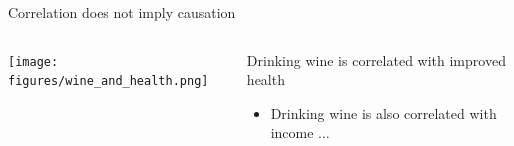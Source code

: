 \documentclass[aspectratio=169,t,11pt,table]{beamer}
\begin{document}
% 

\begin{frame}{Correlation does not imply causation}
  \begin{columns}[T]
    \begin{column}{.6\textwidth}\vspace*{-\bigskipamount}
      \begin{center}
        \texttt{[image: figures/wine\_and\_health.png]}
      \end{center}
    \end{column}
    \begin{column}{.4\textwidth}
      Drinking wine is correlated with improved health

      \begin{itemize}
        \item Drinking wine is also correlated with income $\dots$
      \end{itemize}
    \end{column}
  \end{columns}
\end{frame}
\end{document}
